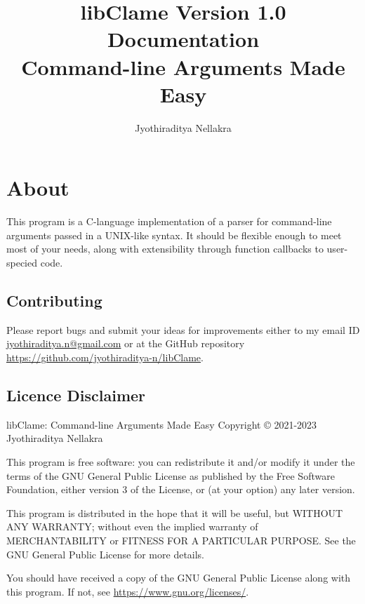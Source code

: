 \documentclass[letterpaper]{article}
\title{libClame Version 1.0 Documentation \\ Command-line Arguments Made Easy}
\author{Jyothiraditya Nellakra}
\begin{document}
\maketitle

\section*{About}

This program is a C-language implementation of a parser for command-line arguments passed in a UNIX-like syntax. It should be flexible enough to meet most of your needs, along with extensibility through function callbacks to user-specied code.

\subsection*{Contributing}

Please report bugs and submit your ideas for improvements either to my email ID \url{jyothiraditya.n@gmail.com} or at the GitHub repository \url{https://github.com/jyothiraditya-n/libClame}. 

\subsection*{Licence Disclaimer}

libClame: Command-line Arguments Made Easy Copyright {\copyright} 2021-2023 Jyothiraditya Nellakra

This program is free software: you can redistribute it and/or modify it under the terms of the GNU General Public License as published by the Free Software Foundation, either version 3 of the License, or (at your option) any later  version.

This program is distributed in the hope that it will be useful, but WITHOUT ANY WARRANTY; without even the implied warranty of MERCHANTABILITY or FITNESS FOR A PARTICULAR PURPOSE. See the GNU General Public License for more details.

You should have received a copy of the GNU General Public License along with this program. If not, see \url{https://www.gnu.org/licenses/}.

\tableofcontents








\end{document}
